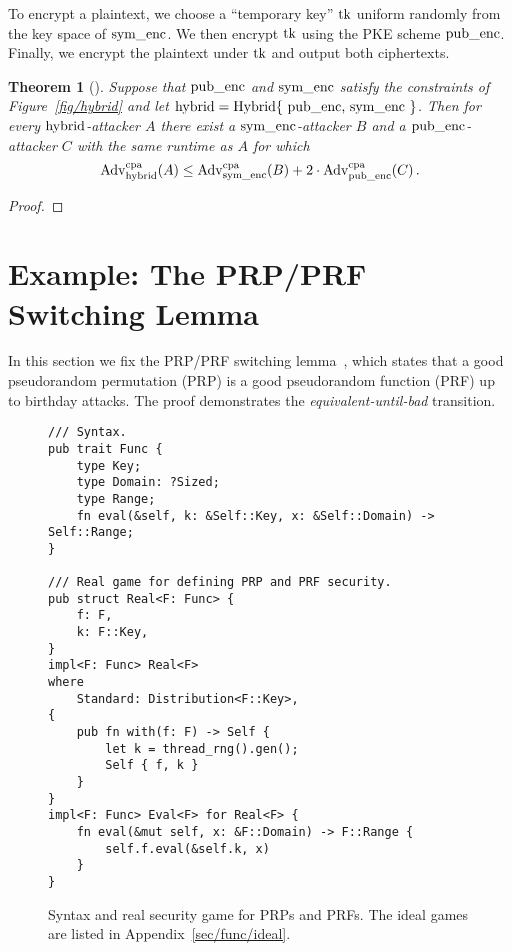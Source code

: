 \documentclass{article}
\newtheorem{theorem}{Theorem}
\newcommand{\Adv}[1]{\textrm{\textup{Adv}}^{\textup{#1}}}
\newcommand{\code}[1]{\textrm{\textup{\lstinline{#1}}}}
\begin{document}
To encrypt a plaintext, we choose a ``temporary key'' $\code{tk}$ uniform
randomly from the key space of $\code{sym_enc}$.
%
We then encrypt $\code{tk}$ using the PKE scheme $\code{pub_enc}$.
%
Finally, we encrypt the plaintext under $\code{tk}$ and output both
ciphertexts.

\begin{theorem}[{\cite[Claim~15.9]{joy}}]\label{thm/hybrid}
  Suppose that $\code{pub_enc}$ and $\code{sym_enc}$ satisfy the constraints of
  Figure~\ref{fig/hybrid} and let $\code{hybrid} = \code{Hybrid\{
    pub_enc, sym_enc \}}$.
  Then for every $\code{hybrid}$-attacker $A$ there exist a
  $\code{sym_enc}$-attacker $B$ and a $\code{pub_enc}$-attacker $C$ with
  the same runtime as $A$ for which
  \[
    \Adv{cpa}_\code{hybrid}(A) \leq
      \Adv{cpa}_\code{sym_enc}(B) +
      2\cdot\Adv{cpa}_\code{pub_enc}(C) \,.
  \]
\end{theorem}

\begin{proof}
  
\end{proof}


\section{Example: The PRP/PRF Switching Lemma}\label{sec/switching}

In this section we fix the PRP/PRF switching lemma~\cite{BR06}, which states
that a good pseudorandom permutation (PRP) is a good pseudorandom function
(PRF) up to birthday attacks.
%
The proof demonstrates the \emph{equivalent-until-bad} transition.

\begin{figure}[t]
\begin{lstlisting}
/// Syntax.
pub trait Func {
    type Key;
    type Domain: ?Sized;
    type Range;
    fn eval(&self, k: &Self::Key, x: &Self::Domain) -> Self::Range;
}

/// Real game for defining PRP and PRF security.
pub struct Real<F: Func> {
    f: F,
    k: F::Key,
}
impl<F: Func> Real<F>
where
    Standard: Distribution<F::Key>,
{
    pub fn with(f: F) -> Self {
        let k = thread_rng().gen();
        Self { f, k }
    }
}
impl<F: Func> Eval<F> for Real<F> {
    fn eval(&mut self, x: &F::Domain) -> F::Range {
        self.f.eval(&self.k, x)
    }
}
\end{lstlisting}
  \caption{Syntax and real security game for PRPs and PRFs. The ideal games are
  listed in Appendix~\ref{sec/func/ideal}.}
  \label{fig/func/syntax}
  \label{fig/func/real}
\end{figure}
\end{document}
